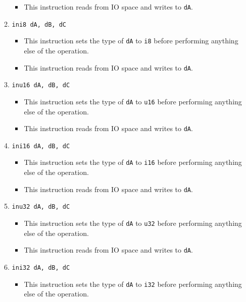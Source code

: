 \documentclass{article}
\begin{document}
\begin{itemize}
\begin{enumerate}
\begin{itemize}
				\item This instruction reads from IO space and writes to
				\texttt{dA}.
				\end{itemize}
			\item \texttt{ini8 dA, dB, dC}
				\begin{itemize}
				\item This instruction sets the type of \texttt{dA} to
				\texttt{i8} before performing anything else of the
				operation.

				\item This instruction reads from IO space and writes to
				\texttt{dA}.
				\end{itemize}
			\item \texttt{inu16 dA, dB, dC}
				\begin{itemize}
				\item This instruction sets the type of \texttt{dA} to
				\texttt{u16} before performing anything else of the
				operation.

				\item This instruction reads from IO space and writes to
				\texttt{dA}.
				\end{itemize}
			\item \texttt{ini16 dA, dB, dC}
				\begin{itemize}
				\item This instruction sets the type of \texttt{dA} to
				\texttt{i16} before performing anything else of the
				operation.

				\item This instruction reads from IO space and writes to
				\texttt{dA}.
				\end{itemize}

			\item \texttt{inu32 dA, dB, dC}
				\begin{itemize}
				\item This instruction sets the type of \texttt{dA} to
				\texttt{u32} before performing anything else of the
				operation.

				\item This instruction reads from IO space and writes to
				\texttt{dA}.
				\end{itemize}
			\item \texttt{ini32 dA, dB, dC}
				\begin{itemize}
				\item This instruction sets the type of \texttt{dA} to
				\texttt{i32} before performing anything else of the
				operation.


\end{itemize}
\end{enumerate}
\end{itemize}
\end{document}
